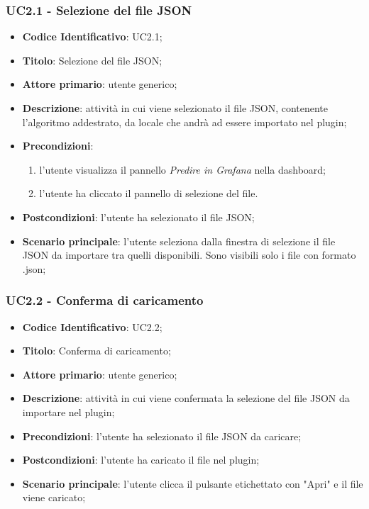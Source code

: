 		
		\label{par:UC2.1}
		\subsubsection{UC2.1 - Selezione del file JSON}
		\begin{itemize}
			\item\textbf{Codice Identificativo}: UC2.1;
			\item\textbf{Titolo}: Selezione del file JSON;
			\item\textbf{Attore primario}: utente generico;
			\item\textbf{Descrizione}: attività in cui viene selezionato il file JSON, contenente l'algoritmo addestrato, da locale che andrà ad essere importato nel plugin;
			\item\textbf{Precondizioni}:
				\begin{enumerate}
					\item l'utente visualizza il pannello \textit{Predire in Grafana} nella dashboard;
					\item l'utente ha cliccato il pannello di selezione del file.
					\end{enumerate}
			\item\textbf{Postcondizioni}: l'utente ha selezionato il file JSON;
			\item\textbf{Scenario principale}: l'utente seleziona dalla finestra di selezione il file JSON da importare tra quelli disponibili. Sono visibili solo i file con formato .json;
					
			\end{itemize}
		
		\label{par:UC2.2} 
		\subsubsection{UC2.2 - Conferma di caricamento}
		\begin{itemize}
			\item\textbf{Codice Identificativo}: UC2.2;
			\item\textbf{Titolo}: Conferma di caricamento;
			\item\textbf{Attore primario}: utente generico;
			\item\textbf{Descrizione}: attività in cui viene confermata la selezione del file JSON da importare nel plugin;
			\item\textbf{Precondizioni}: l'utente ha selezionato il file JSON da caricare;
			\item\textbf{Postcondizioni}: l'utente ha caricato il file nel plugin;
			\item\textbf{Scenario principale}: l'utente clicca il pulsante etichettato con "Apri" e il file viene caricato;
			
		\end{itemize}
		
